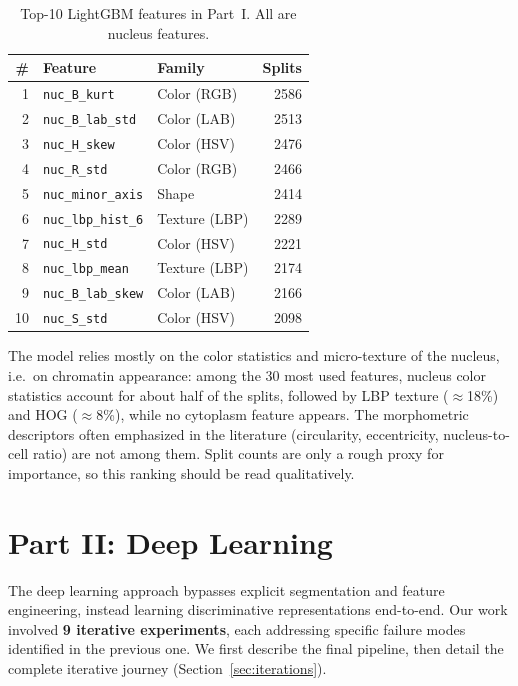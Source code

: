 \documentclass[twocolumn,a4paper]{article}
\begin{document}
\begin{table}[htbp]
\centering
\caption{Top-10 LightGBM features in Part~I. All are nucleus features.}
\label{tab:top10_features_ml}
\small
\begin{tabular}{rllr}
\toprule
\textbf{\#} & \textbf{Feature} & \textbf{Family} & \textbf{Splits} \\
\midrule
1  & \texttt{nuc\_B\_kurt}     & Color (RGB)   & 2586 \\
2  & \texttt{nuc\_B\_lab\_std} & Color (LAB)   & 2513 \\
3  & \texttt{nuc\_H\_skew}     & Color (HSV)   & 2476 \\
4  & \texttt{nuc\_R\_std}      & Color (RGB)   & 2466 \\
5  & \texttt{nuc\_minor\_axis} & Shape         & 2414 \\
6  & \texttt{nuc\_lbp\_hist\_6}& Texture (LBP) & 2289 \\
7  & \texttt{nuc\_H\_std}      & Color (HSV)   & 2221 \\
8  & \texttt{nuc\_lbp\_mean}   & Texture (LBP) & 2174 \\
9  & \texttt{nuc\_B\_lab\_skew}& Color (LAB)   & 2166 \\
10 & \texttt{nuc\_S\_std}      & Color (HSV)   & 2098 \\
\bottomrule
\end{tabular}
\end{table}

The model relies mostly on the color statistics and micro-texture of the nucleus, i.e.\ on chromatin appearance: among the 30 most used features, nucleus color statistics account for about half of the splits, followed by LBP texture ($\approx$18\%) and HOG ($\approx$8\%), while no cytoplasm feature appears. The morphometric descriptors often emphasized in the literature (circularity, eccentricity, nucleus-to-cell ratio) are not among them. Split counts are only a rough proxy for importance, so this ranking should be read qualitatively.

\section{Part II: Deep Learning}

The deep learning approach bypasses explicit segmentation and feature engineering, instead learning discriminative representations end-to-end. Our work involved \textbf{9 iterative experiments}, each addressing specific failure modes identified in the previous one. We first describe the final pipeline, then detail the complete iterative journey (Section~\ref{sec:iterations}).
\end{document}
